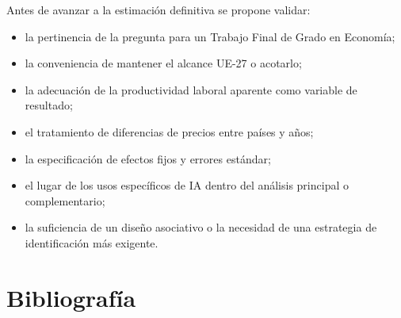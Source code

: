 \documentclass[12pt,a4paper]{article}
\begin{document}
Antes de avanzar a la estimación definitiva se propone validar:

\begin{itemize}
  \item la pertinencia de la pregunta para un Trabajo Final de Grado en Economía;
  \item la conveniencia de mantener el alcance UE-27 o acotarlo;
  \item la adecuación de la productividad laboral aparente como variable de resultado;
  \item el tratamiento de diferencias de precios entre países y años;
  \item la especificación de efectos fijos y errores estándar;
  \item el lugar de los usos específicos de IA dentro del análisis principal o complementario;
  \item la suficiencia de un diseño asociativo o la necesidad de una estrategia de identificación más exigente.
\end{itemize}

\clearpage
\section{Bibliografía}
\renewcommand{\refname}{}


\end{document}
